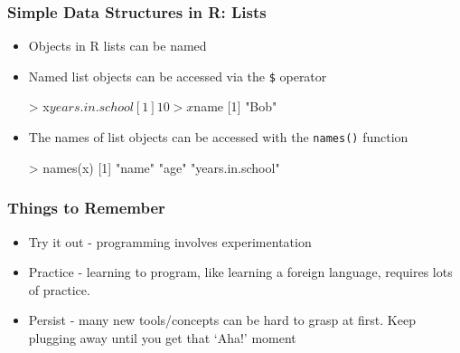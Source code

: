 \documentclass{beamer}
\begin{document}
\begin{frame}[fragile]
  \frametitle{Simple Data Structures in R: Lists}


\begin{itemize}

\item Objects in R lists can be named


\item Named list objects can be accessed via the \texttt{\$} operator

\begin{Rcode}
> x$years.in.school
[1] 10
> x$name
[1] "Bob"
\end{Rcode}

\item The names of list objects can be accessed with the \texttt{names()} function

\begin{Rcode}
> names(x)
[1] "name"  "age"  "years.in.school"
\end{Rcode}

\end{itemize}

\end{frame}



\begin{frame}
  \frametitle{Things to Remember}

\begin{itemize}

 \item Try it out - programming involves experimentation
 \item Practice - learning to program, like learning a foreign language, requires lots of practice.
 \item Persist - many new tools/concepts can be hard to grasp at first. Keep plugging away until you get that `Aha!' moment
\end{itemize}


\end{frame}
\end{document}
